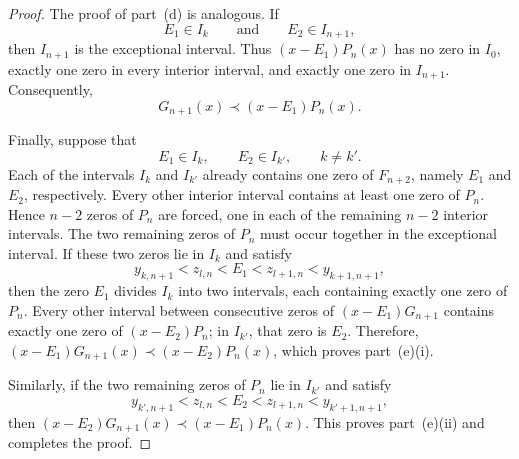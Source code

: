 \documentclass[10pt,a4paper]{amsart}
\begin{document}
\begin{proof}
\medskip \noindent The proof of part~(d) is analogous. If
\[
E_1\in I_k
\qquad\text{and}\qquad
E_2\in I_{n+1},
\]
then $I_{n+1}$ is the exceptional interval. Thus
$(x-E_1)P_n(x)$ has no zero in $I_0$, exactly one zero in every
interior interval, and exactly one zero in $I_{n+1}$. Consequently,
\[
G_{n+1}(x)\prec (x-E_1)P_n(x).
\]

\medskip \noindent Finally, suppose that
\[
E_1\in I_k,
\qquad
E_2\in I_{k'},
\qquad
k\neq k'.
\] Each of the intervals $I_k$ and $I_{k'}$ already contains one zero
of $F_{n+2}$, namely $E_1$ and $E_2$, respectively. Every other
interior interval contains at least one zero of $P_n$. Hence
$n-2$ zeros of $P_n$ are forced, one in each of the remaining
$n-2$ interior intervals. The two remaining zeros of $P_n$ must
occur together in the exceptional interval. If these two zeros lie in $I_k$ and satisfy
\[
y_{k,n+1}<z_{l,n}<E_1<z_{l+1,n}<y_{k+1,n+1},
\]
then the zero $E_1$ divides $I_k$ into two intervals, each
containing exactly one zero of $P_n$. Every other interval between
consecutive zeros of $(x-E_1)G_{n+1}$ contains exactly one zero of
$(x-E_2)P_n$; in $I_{k'}$, that zero is $E_2$. Therefore, $(x-E_1)G_{n+1}(x)\prec (x-E_2)P_n(x)$, which proves part~(e)(i).

\medskip \noindent Similarly, if the two remaining zeros of $P_n$ lie in $I_{k'}$ and
satisfy
\[
y_{k',n+1}<z_{l,n}<E_2<z_{l+1,n}<y_{k'+1,n+1},
\]
then $(x-E_2)G_{n+1}(x)\prec (x-E_1)P_n(x)$. This proves part~(e)(ii) and completes the proof.
\end{proof}
\end{document}
